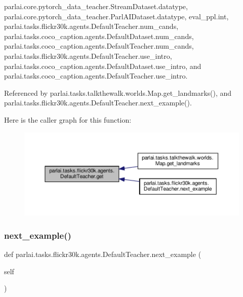 parlai.\+core.\+pytorch\+\_\+data\+\_\+teacher.\+Stream\+Dataset.\+datatype, parlai.\+core.\+pytorch\+\_\+data\+\_\+teacher.\+Parl\+A\+I\+Dataset.\+datatype, eval\+\_\+ppl.\+int, parlai.\+tasks.\+flickr30k.\+agents.\+Default\+Teacher.\+num\+\_\+cands, parlai.\+tasks.\+coco\+\_\+caption.\+agents.\+Default\+Dataset.\+num\+\_\+cands, parlai.\+tasks.\+coco\+\_\+caption.\+agents.\+Default\+Teacher.\+num\+\_\+cands, parlai.\+tasks.\+flickr30k.\+agents.\+Default\+Teacher.\+use\+\_\+intro, parlai.\+tasks.\+coco\+\_\+caption.\+agents.\+Default\+Dataset.\+use\+\_\+intro, and parlai.\+tasks.\+coco\+\_\+caption.\+agents.\+Default\+Teacher.\+use\+\_\+intro.



Referenced by parlai.\+tasks.\+talkthewalk.\+worlds.\+Map.\+get\+\_\+landmarks(), and parlai.\+tasks.\+flickr30k.\+agents.\+Default\+Teacher.\+next\+\_\+example().

Here is the caller graph for this function\+:
\nopagebreak
\begin{figure}[H]
\begin{center}
\leavevmode
\includegraphics[width=350pt]{classparlai_1_1tasks_1_1flickr30k_1_1agents_1_1DefaultTeacher_a55dc5ed3f7e99ad143248a9fba87e2b2_icgraph}
\end{center}
\end{figure}
\mbox{\label{classparlai_1_1tasks_1_1flickr30k_1_1agents_1_1DefaultTeacher_ada88912036e5d75c2f2a5bff298b1d88}} 
\subsubsection{\texorpdfstring{next\+\_\+example()}{next\_example()}}
{\footnotesize\ttfamily def parlai.\+tasks.\+flickr30k.\+agents.\+Default\+Teacher.\+next\+\_\+example (\begin{DoxyParamCaption}\item[{}]{self }\end{DoxyParamCaption})}

